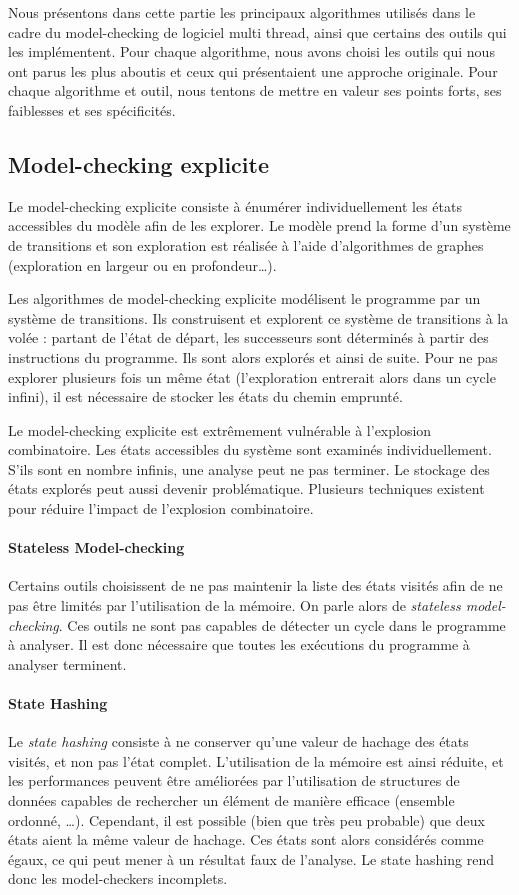 Nous présentons dans cette partie les principaux algorithmes utilisés dans le
cadre du model-checking de logiciel multi thread, ainsi que certains des outils
qui les implémentent. Pour chaque algorithme, nous avons choisi les outils qui
nous ont parus les plus aboutis et ceux qui présentaient une approche originale.
Pour chaque algorithme et outil, nous tentons de mettre en valeur ses points
forts, ses faiblesses et ses spécificités.

\subsection{Model-checking explicite}

Le model-checking explicite consiste à énumérer individuellement les
états accessibles du modèle afin de les explorer. Le modèle prend la
forme d'un système de transitions et son exploration est réalisée à
l'aide d'algorithmes de graphes (exploration en largeur ou en
profondeur\dots).

Les algorithmes de model-checking explicite modélisent le programme par un
système de transitions. Ils construisent et explorent ce système de transitions
à la volée : partant de l'état de départ, les successeurs sont déterminés à
partir des instructions du programme. Ils sont alors explorés et ainsi de suite.
Pour ne pas explorer plusieurs fois un même état (l'exploration entrerait alors
dans un cycle infini), il est nécessaire de stocker les états du chemin
emprunté.

Le model-checking explicite est extrêmement vulnérable à l'explosion
combinatoire. Les états accessibles du système sont examinés individuellement.
S’ils sont en nombre infinis, une analyse peut ne pas terminer. Le stockage des
états explorés peut aussi devenir problématique. Plusieurs techniques existent
pour réduire l'impact de l'explosion combinatoire.

\paragraph{Stateless Model-checking}
Certains outils choisissent de ne pas maintenir la liste des états
visités afin de ne pas être limités par l'utilisation de la mémoire. On
parle alors de \emph{stateless model-checking}. Ces outils ne sont pas
capables de détecter un cycle dans le programme à analyser. Il est donc
nécessaire que toutes les exécutions du programme à analyser terminent.

\paragraph{State Hashing}
Le \emph{state hashing} consiste à ne conserver qu'une valeur de hachage des
états visités, et non pas l'état complet. L'utilisation de la mémoire est ainsi
réduite, et les performances peuvent être améliorées par l'utilisation de
structures de données capables de rechercher un élément de manière efficace
(ensemble ordonné, \dots). Cependant, il est possible (bien que très peu
probable) que deux états aient la même valeur de hachage. Ces états sont alors
considérés comme égaux, ce qui peut mener à un résultat faux de l'analyse.
Le state hashing rend donc les model-checkers incomplets.

